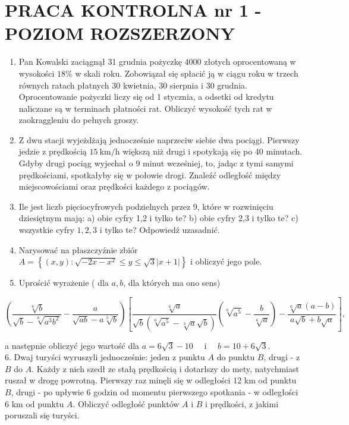 \documentclass[10pt]{article}
\begin{document}
\section*{PRACA KONTROLNA nr 1 - POZIOM ROZSZERZONY}
\begin{enumerate}
  \item Pan Kowalski zaciągnął 31 grudnia pożyczkę 4000 złotych oprocentowaną w wysokości $18 \%$ w skali roku. Zobowiązał się spłacić ją w ciągu roku w trzech równych ratach płatnych 30 kwietnia, 30 sierpnia i 30 grudnia. Oprocentowanie pożyczki liczy się od 1 stycznia, a odsetki od kredytu naliczane są w terminach płatności rat. Obliczyć wysokość tych rat w zaokraggleniu do pełnych groszy.
  \item Z dwu stacji wyjeżdżają jednocześnie naprzeciw siebie dwa pociągi. Pierwszy jedzie z prędkością $15 \mathrm{~km} / \mathrm{h}$ większą niż drugi i spotykają się po 40 minutach. Gdyby drugi pociąg wyjechał o 9 minut wcześniej, to, jadąc z tymi samymi prędkościami, spotkałyby się w połowie drogi. Znaleźć odległość między miejscowościami oraz prędkości każdego z pociągów.
  \item Ile jest liczb pięciocyfrowych podzielnych przez 9, które w rozwinięciu dziesiętnym mają: a) obie cyfry 1,2 i tylko te? b) obie cyfry 2,3 i tylko te? c) wszystkie cyfry $1,2,3$ i tylko te? Odpowiedź uzasadnić.
  \item Narysować na płaszczyźnie zbiór $A=\left\{(x, y): \sqrt{-2 x-x^{2}} \leqslant y \leqslant \sqrt{3}|x+1|\right\}$ i obliczyć jego pole.
  \item Uprościć wyrażenie ( dla $a, b$, dla których ma ono sens)
\end{enumerate}

$$
\left(\frac{\sqrt[6]{b}}{\sqrt{b}-\sqrt[6]{a^{3} b^{2}}}-\frac{a}{\sqrt{a b}-a \sqrt[3]{b}}\right)\left[\frac{\sqrt[6]{a}}{\sqrt{b}\left(\sqrt[6]{a^{5}}-\sqrt[3]{a} \sqrt{b}\right)}\left(\sqrt[6]{a^{5}}-\frac{b}{\sqrt[6]{a}}\right)-\frac{\sqrt[6]{a}(a-b)}{a \sqrt{b}+b \sqrt{a}}\right],
$$

a następnie obliczyć jego wartość dla $a=6 \sqrt{3}-10 \quad$ i $\quad b=10+6 \sqrt{3}$.\\
6. Dwaj turyści wyruszyli jednocześnie: jeden z punktu $A$ do punktu $B$, drugi - z $B$ do $A$. Każdy z nich szedł ze stałą prędkością i dotarłszy do mety, natychmiast ruszał w drogę powrotną. Pierwszy raz minęli się w odległości 12 km od punktu $B$, drugi - po upływie 6 godzin od momentu pierwszego spotkania - w odległości 6 km od punktu $A$. Obliczyć odległość punktów $A$ i $B$ i prędkości, z jakimi poruszali się turyści.
\end{document}
